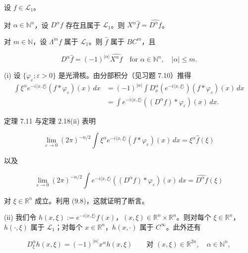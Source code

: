\begin{proposition}

设 $ f \in \mathcal{L}_1 $。

\begin{subitems}
\item

对 $ \alpha \in \mathbb{N}^n $，设 $ D^{\alpha}f $ 存在且属于 $ \mathcal{L}_1 $。则 $ X^{\alpha}\hat{f} = \widehat{D^{\alpha}f} $。

\item

对 $ m \in \mathbb{N} $，设 $ \Lambda^m f $ 属于 $ \mathcal{L}_1 $。则 $ \hat{f} $ 属于 $ BC^m $，且

\[
D^{\alpha}\hat{f} = (-1)^{|\alpha|}\widehat{X^{\alpha}f} \quad \text{for } \alpha \in \mathbb{N}^n , \quad |\alpha| \le m .
\]

\proofhead
(i) 设 $ \{\varphi_{\varepsilon} ; \varepsilon > 0\} $ 是光滑核。由分部积分（见习题 7.10）推得
\begin{equation}
\begin{aligned}
\int \xi^{\alpha}e^{-i\langle x,\xi\rangle}(f*\varphi_{\varepsilon})(x)\,dx &= (-1)^{|\alpha|}\int D_x^{\alpha}(e^{-i\langle x,\xi\rangle})(f*\varphi_{\varepsilon})(x)\,dx \\ &= \int e^{-i\langle x,\xi\rangle}((D^{\alpha}f)*\varphi_{\varepsilon})(x)\,dx .
\end{aligned}\tag{9.8}
\end{equation}

定理 7.11 与定理 2.18(ii) 表明

\[
\lim_{\varepsilon\to0}(2\pi)^{-n/2}\int\xi^\alpha e^{-i\langle x,\xi\rangle}(f*\varphi_\varepsilon)(x)\,dx = \xi^\alpha\widehat{f}(\xi)
\]

以及

\[
\lim_{\varepsilon\to0}(2\pi)^{-n/2}\int e^{-i\langle x,\xi\rangle}\left((D^\alpha f)*\varphi_\varepsilon\right)(x)\,dx = \widehat{D^\alpha f}(\xi)
\]

对 $ \xi \in \mathbb{R}^n $ 成立。利用 (9.8)，这就证明了断言。

\end{subitems}

(ii) 我们令 $ h(x,\xi) := e^{-i\langle x,\xi\rangle}f(x) $，$ (x,\xi) \in \mathbb{R}^n \times \mathbb{R}^n $。则对每个 $ \xi \in \mathbb{R}^n $，$ h(\cdot,\xi) $ 属于 $ \mathcal{L}_1 $；对每个 $ x \in \mathbb{R}^n $，$ h(x,\cdot) $ 属于 $ C^\infty $。此外还有

\[
D_\xi^\alpha h(x,\xi) = (-1)^{|\alpha|}x^\alpha h(x,\xi) \qquad \text{对 } (x,\xi) \in \mathbb{R}^{2n}, \quad \alpha \in \mathbb{N}^n,
\]


\end{proposition}
